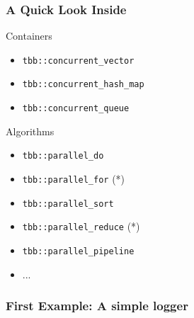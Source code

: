 \documentclass[9pt,pdftex]{beamer}
\begin{document}
\begin{frame}
  \frametitle{A Quick Look Inside}
  \begin{block}{Containers}
    \begin{itemize}
    \item \texttt{tbb::concurrent_vector}
    \item \texttt{tbb::concurrent_hash_map}
    \item \texttt{tbb::concurrent_queue}
    \end{itemize}
  \end{block}

  \begin{block}{Algorithms}
    \begin{itemize}
    \item \texttt{tbb::parallel_do}
    \item \texttt{tbb::parallel_for} (*)
    \item \texttt{tbb::parallel_sort}
    \item \texttt{tbb::parallel_reduce} (*)
    \item \texttt{tbb::parallel_pipeline}
    \item ...
    \end{itemize}
  \end{block}
  
\end{frame}

\begin{frame}
  \frametitle{First Example: A simple logger}
  
\end{frame}

   
\end{document}
